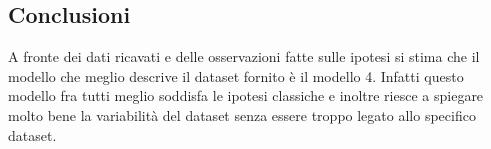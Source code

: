 \subsection{Conclusioni}
A fronte dei dati ricavati e delle osservazioni fatte sulle ipotesi si stima che il modello che meglio descrive il dataset fornito è il modello 4. Infatti questo modello fra tutti meglio soddisfa le ipotesi classiche e inoltre riesce a spiegare molto bene la variabilità del dataset senza essere troppo legato allo specifico dataset. 


